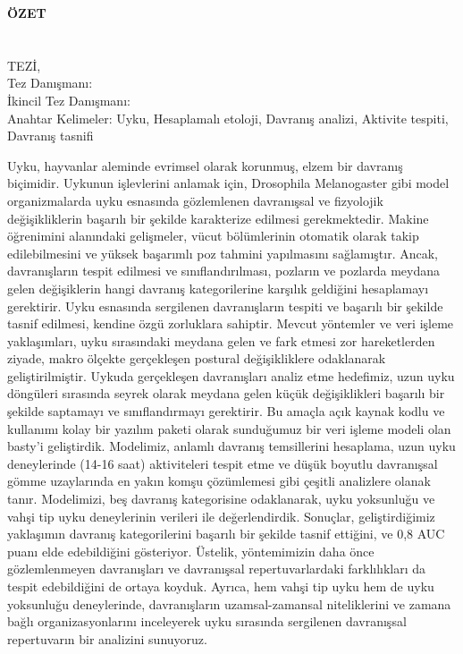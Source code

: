 \clearpage\pagebreak
\begin{center}
	\MakeUppercase{\textbf{Özet}} \\ [3\baselineskip]
	\MakeUppercase{\thesistitletr} \\ [3\baselineskip]
	\MakeUppercase{\student} \\[\baselineskip]
	\MakeUppercase{\majortr \degreetr Tez\.{ı}, \monthtr~\year} \\[\baselineskip]
	Tez Danışmanı: \advisortr \\
	İkincil Tez Danışmanı: \coadvisortr \\
	[2\baselineskip]
	Anahtar Kelimeler: Uyku, Hesaplamalı etoloji, Davranış analizi, Aktivite tespiti, Davranış tasnifi
\end{center}

\singlespacing

Uyku, hayvanlar aleminde evrimsel olarak korunmuş, elzem bir davranış biçimidir.
Uykunun işlevlerini anlamak için, Drosophila Melanogaster gibi model organizmalarda uyku esnasında gözlemlenen davranışsal ve fizyolojik değişikliklerin başarılı bir şekilde karakterize edilmesi gerekmektedir.
Makine öğrenimini alanındaki gelişmeler, vücut bölümlerinin otomatik olarak takip edilebilmesini ve yüksek başarımlı poz tahmini yapılmasını sağlamıştır.
Ancak, davranışların tespit edilmesi ve sınıflandırılması, pozların ve pozlarda meydana gelen değişiklerin hangi davranış kategorilerine karşılık geldiğini hesaplamayı gerektirir.
Uyku esnasında sergilenen davranışların tespiti ve başarılı bir şekilde tasnif edilmesi, kendine özgü zorluklara sahiptir.
Mevcut yöntemler ve veri işleme yaklaşımları, uyku sırasındaki meydana gelen ve fark etmesi zor hareketlerden ziyade, makro ölçekte gerçekleşen postural değişikliklere odaklanarak geliştirilmiştir.
Uykuda gerçekleşen davranışları analiz etme hedefimiz, uzun uyku döngüleri sırasında seyrek olarak meydana gelen küçük değişiklikleri başarılı bir şekilde saptamayı ve sınıflandırmayı gerektirir.
Bu amaçla açık kaynak kodlu ve kullanımı kolay bir yazılım paketi olarak sunduğumuz bir veri işleme modeli olan basty’i geliştirdik.
Modelimiz, anlamlı davranış temsillerini hesaplama, uzun uyku deneylerinde (14-16 saat) aktiviteleri tespit etme ve düşük boyutlu davranışsal gömme uzaylarında en yakın komşu çözümlemesi gibi çeşitli analizlere olanak tanır.
Modelimizi, beş davranış kategorisine odaklanarak, uyku yoksunluğu ve vahşi tip uyku deneylerinin verileri ile değerlendirdik.
Sonuçlar, geliştirdiğimiz yaklaşımın davranış kategorilerini başarılı bir şekilde tasnif ettiğini, ve 0,8 AUC puanı elde edebildiğini gösteriyor.
Üstelik, yöntemimizin daha önce gözlemlenmeyen davranışları ve davranışsal repertuvarlardaki farklılıkları da tespit edebildiğini de ortaya koyduk.
Ayrıca, hem vahşi tip uyku hem de uyku yoksunluğu deneylerinde, davranışların uzamsal-zamansal niteliklerini ve zamana bağlı organizasyonlarını inceleyerek uyku sırasında sergilenen davranışsal repertuvarın bir analizini sunuyoruz.

\onehalfspacing
